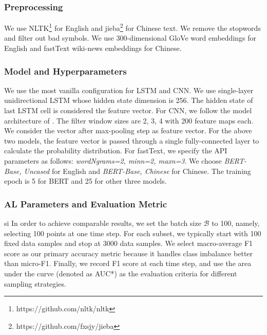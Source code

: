 
\subsubsection{Preprocessing}
We use NLTK\footnote{https://github.com/nltk/nltk} for English and jieba\footnote{https://github.com/fxsjy/jieba} for Chinese text.
We remove the stopwords and filter out bad symbols. 
We use 300-dimensional GloVe word embeddings \cite{pennington2014glove} 
for English and fastText wiki-news embeddings \cite{mikolov2018advances} for Chinese.

\subsubsection{Model and Hyperparameters}
We use the most vanilla configuration for LSTM and CNN. We use single-layer unidirectional LSTM whose hidden state dimension is 256. The hidden state of last LSTM cell is considered the feature vector. For CNN, we follow the model architecture of \cite{kim2014convolutional}. The filter window sizes are 2, 3, 4 with 200 feature maps each. We consider the vector after max-pooling step as feature vector. For the above two models, the feature vector is passed through a single fully-connected layer to calculate the probability distribution. 
For fastText, we specify the API parameters as follows: \emph{wordNgrams=2, minn=2, maxn=3}. 
We choose \emph{BERT-Base, Uncased} for English and \emph{BERT-Base, Chinese} for Chinese.
The training epoch is 5 for BERT and 25 for other three models.


\subsubsection{AL Parameters and Evaluation Metric}
si
In order to achieve comparable results, we set the batch size $\mathcal{B}$ to 100, namely, selecting 100 points at one time step. For each subset, we typically start with 100 fixed data samples and stop at 3000 data samples. 
We select macro-average F1 score as our primary accuracy metric because it handles
class imbalance better than micro-F1. Finally, we record F1 score at each time step, 
and use the area under the curve (denoted as AUC*) as the evaluation criteria for different
sampling strategies. 

